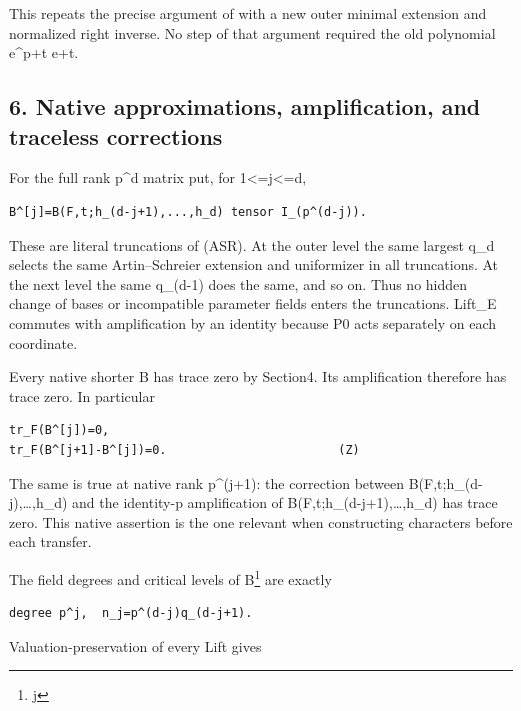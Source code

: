 This repeats the precise argument of  with a new
outer minimal extension and normalized right inverse. No step of that
argument required the old polynomial e\^{}p+t e+t.

\hypertarget{odd_tower-native-approximations-amplification-and-traceless-corrections}{%
\subsection{6. Native approximations, amplification, and traceless
corrections}\label{odd_tower-native-approximations-amplification-and-traceless-corrections}}

For the full rank p\^{}d matrix put, for 1\textless=j\textless=d,

\begin{Verbatim}[fontsize=\small,breaklines=true,breakanywhere=true]
B^[j]=B(F,t;h_(d-j+1),...,h_d) tensor I_(p^(d-j)).
\end{Verbatim}

These are literal truncations of (ASR). At the outer level the same
largest q\_d selects the same Artin--Schreier extension and uniformizer
in all truncations. At the next level the same q\_(d-1) does the same,
and so on. Thus no hidden change of bases or incompatible parameter
fields enters the truncations. Lift\_E commutes with amplification by an
identity because P0 acts separately on each coordinate.

Every native shorter B has trace zero by Section4. Its amplification
therefore has trace zero. In particular

\begin{Verbatim}[fontsize=\small,breaklines=true,breakanywhere=true]
tr_F(B^[j])=0,
tr_F(B^[j+1]-B^[j])=0.                        (Z)
\end{Verbatim}

The same is true at native rank p\^{}(j+1): the correction between
B(F,t;h\_(d-j),\ldots,h\_d) and the identity-p amplification of
B(F,t;h\_(d-j+1),\ldots,h\_d) has trace zero. This native assertion is
the one relevant when constructing characters before each transfer.

The field degrees and critical levels of B\footnote{j} are exactly

\begin{Verbatim}[fontsize=\small,breaklines=true,breakanywhere=true]
degree p^j,  n_j=p^(d-j)q_(d-j+1).
\end{Verbatim}

Valuation-preservation of every Lift gives

